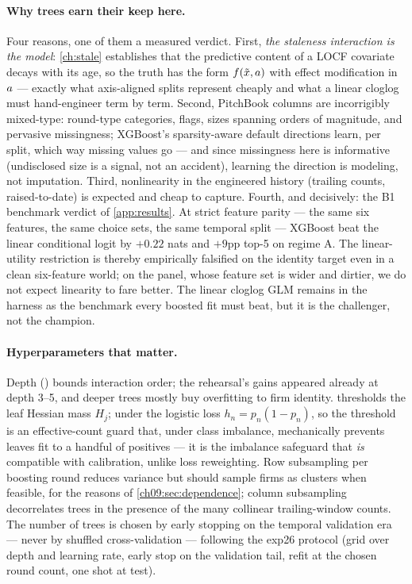 \paragraph{Why trees earn their keep here.} Four reasons, one of them a
measured verdict. First, \emph{the staleness interaction is the model}:
\cref{ch:stale} establishes that the predictive content of a LOCF
covariate decays with its age, so the truth has the form
$f(\tilde{x}, a)$ with effect modification in $a$ ---
exactly what axis-aligned splits represent cheaply and what a linear
cloglog must hand-engineer term by term. Second, PitchBook columns are
incorrigibly mixed-type: round-type categories, flags, sizes spanning
orders of magnitude, and pervasive missingness; XGBoost's sparsity-aware
default directions \citep{chenguestrin2016} learn, per split, which way
missing values go --- and since missingness here is informative
(undisclosed size is a signal, not an accident), learning the direction
is modeling, not imputation. Third, nonlinearity in the engineered
history (trailing counts, raised-to-date) is expected and cheap to
capture. Fourth, and decisively: the B1 benchmark verdict of
\cref{app:results}. At strict feature parity --- the same six features,
the same choice sets, the same temporal split --- XGBoost beat the linear
conditional logit by $+0.22$ nats and $+9$pp top-5 on regime A. The
linear-utility restriction is thereby empirically falsified on the
identity target even in a clean six-feature world; on the panel, whose
feature set is wider and dirtier, we do not expect linearity to fare
better. The linear cloglog GLM remains in the harness as the benchmark
every boosted fit must beat, but it is the challenger, not the champion.

\paragraph{Hyperparameters that matter.} Depth ()
bounds interaction order; the rehearsal's gains appeared already at
depth 3--5, and deeper trees mostly buy overfitting to firm identity.
 thresholds the leaf Hessian mass $H_j$; under
the logistic loss $h_n = p_n(1-p_n)$, so the threshold is an
effective-count guard that, under class imbalance, mechanically prevents
leaves fit to a handful of positives --- it is the imbalance safeguard
that \emph{is} compatible with calibration, unlike loss reweighting.
Row subsampling per boosting round reduces variance but should sample
firms as clusters when feasible, for the reasons of
\cref{ch09:sec:dependence}; column subsampling decorrelates trees in the
presence of the many collinear trailing-window counts. The number of
trees is chosen by early stopping on the temporal validation era ---
never by shuffled cross-validation --- following the exp26 protocol
(grid over depth and learning rate, early stop on the validation tail,
refit at the chosen round count, one shot at test).

